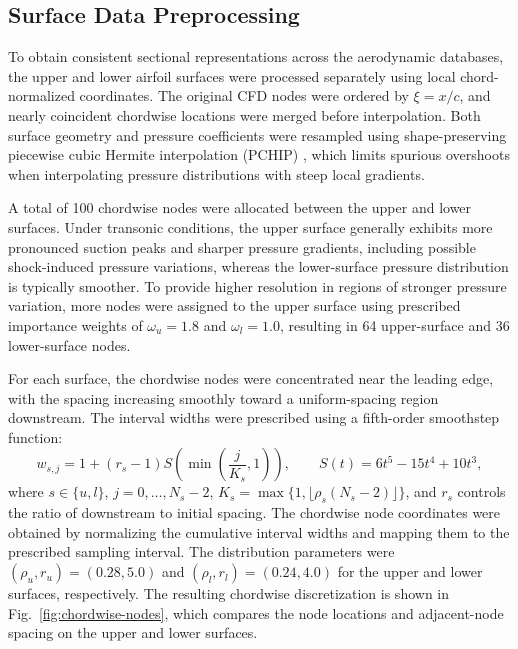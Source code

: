 
\subsection{Surface Data Preprocessing}
\label{sec:data-preprocessing}

To obtain consistent sectional representations across the aerodynamic databases, the upper and lower airfoil surfaces were processed separately using local chord-normalized coordinates. The original CFD nodes were ordered by $\xi=x/c$, and nearly coincident chordwise locations were merged before interpolation. Both surface geometry and pressure coefficients were resampled using shape-preserving piecewise cubic Hermite interpolation (PCHIP) \cite{FritschButland1984}, which limits spurious overshoots when interpolating pressure distributions with steep local gradients.

A total of 100 chordwise nodes were allocated between the upper and lower surfaces. Under transonic conditions, the upper surface generally exhibits more pronounced suction peaks and sharper pressure gradients, including possible shock-induced pressure variations, whereas the lower-surface pressure distribution is typically smoother. To provide higher resolution in regions of stronger pressure variation, more nodes were assigned to the upper surface using prescribed importance weights of $\omega_u=1.8$ and $\omega_l=1.0$, resulting in 64 upper-surface and 36 lower-surface nodes.

For each surface, the chordwise nodes were concentrated near the leading edge, with the spacing increasing smoothly toward a uniform-spacing region downstream. The interval widths were prescribed using a fifth-order smoothstep function:
\begin{equation}
    w_{s,j}=1+(r_s-1)S\left(\min\left(\frac{j}{K_s},1\right)\right),\qquad S(t)=6t^5-15t^4+10t^3,
    \label{eq:chordwise-spacing}
\end{equation}
where $s\in\{u,l\}$, $j=0,\ldots,N_s-2$, $K_s=\max\{1,\lfloor\rho_s(N_s-2)\rfloor\}$, and $r_s$ controls the ratio of downstream to initial spacing. The chordwise node coordinates were obtained by normalizing the cumulative interval widths and mapping them to the prescribed sampling interval. The distribution parameters were $(\rho_u,r_u)=(0.28,5.0)$ and $(\rho_l,r_l)=(0.24,4.0)$ for the upper and lower surfaces, respectively. The resulting chordwise discretization is shown in Fig.~\ref{fig:chordwise-nodes}, which compares the node locations and adjacent-node spacing on the upper and lower surfaces.

